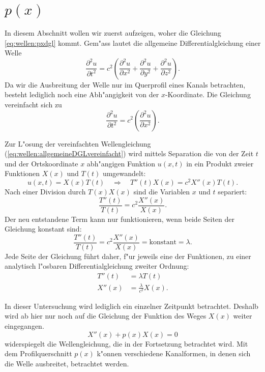 \section{\texorpdfstring{$p(x)$}{p(x)}}
In diesem Abschnitt wollen wir zuerst aufzeigen, woher die Gleichung 
\ref{eq:wellen:pxdgl} kommt. Gem"ass \cite{wellen:smirnow2} lautet 
die allgemeine Differentialgleichung einer Welle
%
\begin{equation*}
	\frac{\partial^2 u}{\partial t^2}
	=
	c^2
	\left(
		\frac{\partial^2 u}{\partial x^2} 
		+ \frac{\partial^2 u}{\partial y^2} 
		+ \frac{\partial^2 u}{\partial z^2}
	\right).
	\label{eq:wellen:allgemeineDGL}
\end{equation*}
Da wir die Ausbreitung der Welle nur im Querprofil eines Kanals betrachten, 
besteht lediglich noch eine Abh"angigkeit von der $x$-Koordinate. Die Gleichung 
vereinfacht sich zu
\begin{equation}
	\frac{\partial^2 u}{\partial t^2}
	=
	c^2
	\left(
		\frac{\partial^2 u}{\partial x^2} 
	\right).
	\label{eq:wellen:allgemeineDGLvereinfacht}
\end{equation}

Zur L"osung der vereinfachten Wellengleichung 
(\ref{eq:wellen:allgemeineDGLvereinfacht}) wird mittels Separation die von der 
Zeit $t$ und der Ortskoordinate $x$ abh"angigen Funktion $u(x,t)$ in ein 
Produkt zweier Funktionen $X(x)$ und $T(t)$ umgewandelt:
\begin{equation*}
	u (x,t) = X(x) T(t)
	\quad
	\Rightarrow\quad T''(t) X(x) = c^2 X''(x)T(t).
\end{equation*}
Nach einer Division durch $T(x)X(x)$ sind die Variablen $x$ und $t$ separiert:
\begin{equation*}
	\frac{T''(t)}{T(t)}
	=
	c^2 \frac{X''(x)}{X(x)}.
\end{equation*}
Der neu entstandene Term kann nur funktionieren, wenn beide Seiten der 
Gleichung konstant sind:
\begin{equation*}
	\frac{T''(t)}{T(t)}
	=
	c^2 \frac{X''(x)}{X(x)} = \text{konstant} = \lambda.
\end{equation*}
Jede Seite der Gleichung führt daher, f"ur jeweils eine der Funktionen, zu 
einer analytisch l"osbaren Differentialgleichung zweiter Ordnung:
\begin{align*}
	T''(t) &= \lambda T(t) \\
	X''(x) &= \frac{\lambda}{c^2}X(x).
\end{align*}

In dieser Untersuchung wird lediglich ein einzelner Zeitpunkt betrachtet.
Deshalb wird ab hier nur noch auf die Gleichung der Funktion des Weges $X(x)$
weiter eingegangen.
\begin{equation*}
	X''(x) + p(x) X(x) = 0
\end{equation*}
widerspiegelt die Wellengleichung, die in der Fortsetzung betrachtet wird. Mit 
dem Profilquerschnitt $p(x)$ k"onnen verschiedene Kanalformen, in denen 
sich die Welle ausbreitet, betrachtet werden.

